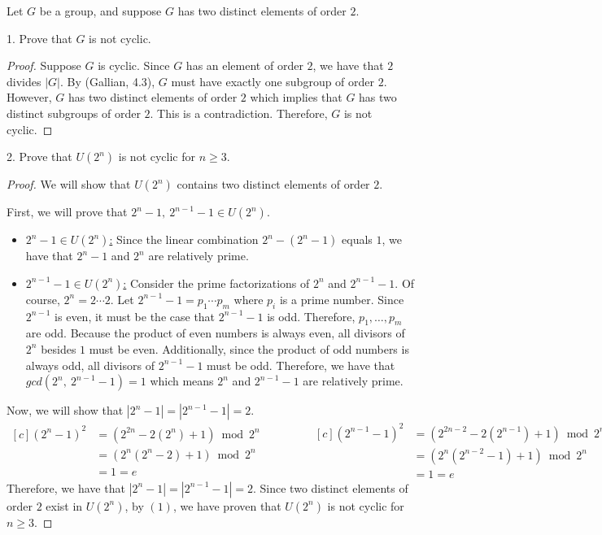 \documentclass[12pt,reqno]{article}
\theoremstyle{plain}
\theoremstyle{definition}
\begin{document}
\newpage


Let \(G\) be a group, and suppose \(G\) has two distinct elements of order \(2\).

1. Prove that \(G\) is not cyclic.
\begin{proof}
    Suppose \(G\) is cyclic. Since \(G\) has an element of order \(2\), we have that \(2\) divides \(|G|\). By (Gallian, 4.3),
    \(G\) must have exactly one subgroup of order \(2\). However, \(G\) has two distinct elements of
    order \(2\) which implies that \(G\) has two distinct subgroups of order \(2\). This is a contradiction. Therefore,
    \(G\) is not cyclic.
\end{proof}

2. Prove that \(U(2^n)\) is not cyclic for \(n\geq 3\).
\begin{proof}
    We will show that \(U(2^n)\) contains two distinct elements of order \(2\).

    First, we will prove that \(2^n-1,\ 2^{n-1}-1\in U(2^n)\).
    \begin{itemize}
        \item \underline{\(2^n-1\in U(2^n)\):} Since the linear combination \(2^n-(2^n-1)\) equals \(1\), we have that
        \(2^n-1\) and \(2^n\) are relatively prime.
        \item \underline{\(2^{n-1}-1\in U(2^n)\):} Consider the prime factorizations of \(2^n\) and \(2^{n-1}-1\).
        Of course, \(2^n=2\cdots 2\). Let \(2^{n-1}-1=p_1\cdots p_m\) where \(p_i\) is a prime number. Since \(2^{n-1}\) is even, it must be the case
        that \(2^{n-1}-1\) is odd. Therefore, \(p_1,\ldots,p_m\) are odd. Because the product of even numbers is always even, all divisors of \(2^n\)
        besides \(1\) must be even. Additionally, since the product of odd numbers is always odd, all divisors of \(2^{n-1}-1\) must be odd. 
        Therefore, we have that \(gcd(2^n,\ 2^{n-1}-1)=1\) which means \(2^n\) and \(2^{n-1}-1\) are relatively prime.
    \end{itemize}

    Now, we will show that \(|2^n-1|=|2^{n-1}-1|=2\).
    \begin{equation*}
        \begin{aligned}[c]
            (2^n-1)^2 &= (2^{2n}-2(2^n)+1)\bmod{2^n}\\
            &= (2^n(2^n-2)+1)\bmod{2^n}\\
            &= 1 = e
        \end{aligned}
        \qquad\qquad
        \begin{aligned}[c]
            (2^{n-1}-1)^2 &= (2^{2n-2}-2(2^{n-1})+1)\bmod{2^n}\\
            &= (2^n(2^{n-2}-1)+1)\bmod{2^n}\\
            &= 1 = e
        \end{aligned}
    \end{equation*}
    Therefore, we have that \(|2^n-1|=|2^{n-1}-1|=2\). Since two distinct elements of 
    order \(2\) exist in \(U(2^n)\), by \((1)\), we have proven that \(U(2^n)\) is not cyclic for \(n\geq 3\).
\end{proof}
\end{document}
